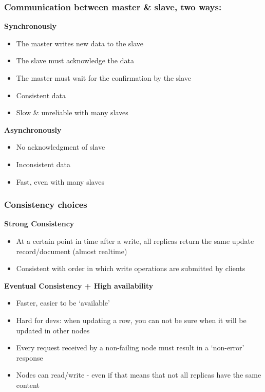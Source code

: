 \documentclass{article}
\begin{document}
\subsubsection{Communication between master \& slave, two ways:}

\textbf{Synchronously}

\begin{itemize}
    \item The master writes new data to the slave
    \item The slave must acknowledge the data
    \item The master must wait for the confirmation by the slave
    \item Consistent data
    \item Slow \& unreliable with many slaves
\end{itemize}

\textbf{Asynchronously}

\begin{itemize}
    \item No acknowledgment of slave
    \item Inconsistent data
    \item Fast, even with many slaves
\end{itemize}

\subsubsection{Consistency choices}

\textbf{Strong Consistency}

\begin{itemize}
    \item At a certain point in time after a write, all replicas return the same update record/document (almost realtime)
    \item Consistent with order in which write operations are submitted by clients
\end{itemize}

\textbf{Eventual Consistency + High availability}

\begin{itemize}
    \item Faster, easier to be `available'
    \item Hard for devs: when updating a row, you can not be sure when it will be updated in other nodes
    \item Every request received by a non-failing node must result in a `non-error' response
    \item Nodes can read/write - even if that means that not all replicas have the same content
\end{itemize}
\end{document}
